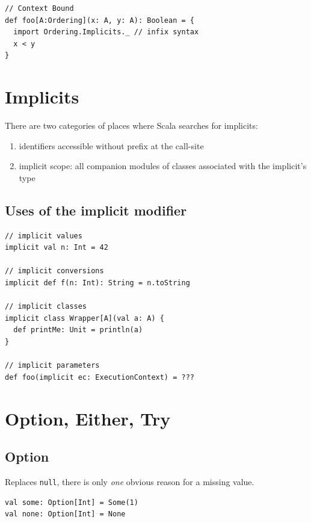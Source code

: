 \documentclass[10pt,landscape,a4paper]{article}
\begin{document}
\begin{multicols*}{4}
\begin{verbatim}
// Context Bound
def foo[A:Ordering](x: A, y: A): Boolean = {
  import Ordering.Implicits._ // infix syntax
  x < y
}
\end{verbatim}

    \section{Implicits}
  There are two categories of places where Scala searches for implicits:
  \begin{enumerate}
  \item identifiers accessible without prefix at the call-site
  \item implicit scope: all companion modules of classes associated
    with the implicit's type
  \end{enumerate}

  \subsection{Uses of the implicit modifier}

\begin{verbatim}
// implicit values
implicit val n: Int = 42

// implicit conversions
implicit def f(n: Int): String = n.toString

// implicit classes
implicit class Wrapper[A](val a: A) {
  def printMe: Unit = println(a)
}

// implicit parameters
def foo(implicit ec: ExecutionContext) = ???
\end{verbatim}

  \newpage{}

  \section{Option, Either, Try}

  \subsection{Option}
  \begin{mdframed}
    Replaces \texttt{null}, there is only \textit{one} obvious
    reason for a missing value.
  \end{mdframed}
  \begin{center}
  \end{center}
\begin{verbatim}
val some: Option[Int] = Some(1)
val none: Option[Int] = None


\end{verbatim}
\end{multicols*}
\end{document}
